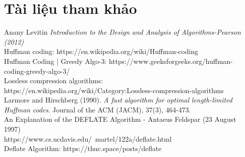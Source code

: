 \cleardoublepage
\chapter*{Tài liệu tham khảo}

\noindent[1]  Anany Levitin  {\itshape Introduction to the Design and Analysis of Algorithms-Pearson (2012)}
\vspace{12pt}\\
\noindent[2] Huffman coding: https://en.wikipedia.org/wiki/Huffman-coding
\vspace{12pt}\\
\noindent[3] Huffman Coding | Greedy Algo-3: https://www.geeksforgeeks.org/huffman-coding-greedy-algo-3/
\vspace{12pt}\\
\noindent[4] Lossless compression algorithms: https://en.wikipedia.org/wiki/Category:Lossless-compression-algorithms
\vspace{12pt}\\
\noindent[4] Larmore and Hirschberg (1990). {\itshape A fast algorithm for optimal length-limited Huffman codes}. Journal of the ACM (JACM), 37(3), 464-473.
\vspace{12pt}\\
\noindent[5] An Explanation of the DEFLATE Algorithm - Antaeus Feldspar (23 August 1997)
\\https://www.cs.ucdavis.edu/~martel/122a/deflate.html
\vspace{12pt}\\
\noindent[6] Deflate Algorithm: https://thuc.space/posts/deflate